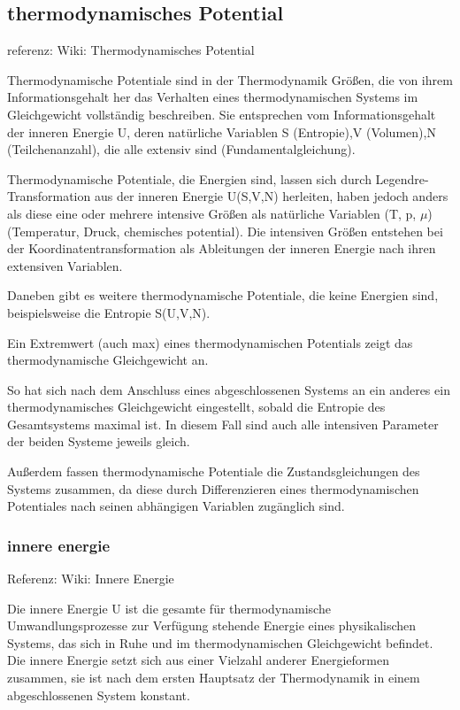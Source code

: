 \documentclass[]{article}
\begin{document}
\subsection{thermodynamisches Potential}
referenz: Wiki: Thermodynamisches Potential

Thermodynamische Potentiale sind in der Thermodynamik Größen, die von ihrem Informationsgehalt her das Verhalten eines thermodynamischen Systems im Gleichgewicht vollständig beschreiben. Sie entsprechen vom Informationsgehalt der inneren Energie U, deren natürliche Variablen S (Entropie),V (Volumen),N (Teilchenanzahl), die alle extensiv sind (Fundamentalgleichung).

Thermodynamische Potentiale, die Energien sind, lassen sich durch Legendre-Transformation aus der inneren Energie U(S,V,N) herleiten, haben jedoch anders als diese eine oder mehrere intensive Größen als natürliche Variablen (T, p, $\mu$) (Temperatur, Druck, chemisches potential). Die intensiven Größen entstehen bei der Koordinatentransformation als Ableitungen der inneren Energie nach ihren extensiven Variablen.

Daneben gibt es weitere thermodynamische Potentiale, die keine Energien sind, beispielsweise die Entropie S(U,V,N).

Ein Extremwert (auch max) eines thermodynamischen Potentials zeigt das thermodynamische Gleichgewicht an.

So hat sich nach dem Anschluss eines abgeschlossenen Systems an ein anderes ein thermodynamisches Gleichgewicht eingestellt, sobald die Entropie des Gesamtsystems maximal ist. In diesem Fall sind auch alle intensiven Parameter der beiden Systeme jeweils gleich. 

Außerdem fassen thermodynamische Potentiale die Zustandsgleichungen des Systems zusammen, da diese durch Differenzieren eines thermodynamischen Potentiales nach seinen abhängigen Variablen zugänglich sind. 

\subsubsection{innere energie}
Referenz: Wiki: Innere Energie

Die innere Energie U ist die gesamte für thermodynamische Umwandlungsprozesse zur Verfügung stehende Energie eines physikalischen Systems, das sich in Ruhe und im thermodynamischen Gleichgewicht befindet. Die innere Energie setzt sich aus einer Vielzahl anderer Energieformen zusammen, sie ist nach dem ersten Hauptsatz der Thermodynamik in einem abgeschlossenen System konstant.	
\end{document}
